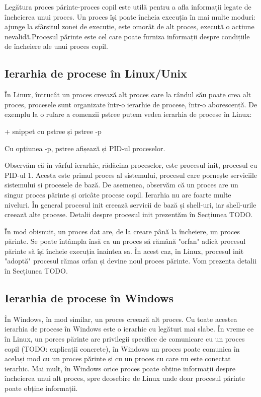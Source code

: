 Legătura proces părinte-proces copil este utilă pentru a afla informații legate
de încheierea unui proces. Un proces își poate încheia execuția în mai multe
moduri: ajunge la sfârșitul zonei de execuție, este omorât de alt proces,
execută o acțiune nevalidă.Procesul părinte este cel care poate furniza
informații despre condițiile de încheiere ale unui proces copil.

\subsection{Ierarhia de procese în Linux/Unix}

În Linux, întrucât un proces creează alt proces care la rândul său poate crea
alt proces, procesele sunt organizate într-o ierarhie de procese, într-o
aborescență. De exemplu la o rulare a comenzii pstree putem vedea ierarhia de
procese în Linux:

+ snippet cu pstree și pstree -p

Cu opțiunea -p, pstree afișează și PID-ul proceselor.

Observăm că în vârful ierarhie, rădăcina proceselor, este procesul init,
procesul cu PID-ul 1. Acesta este primul proces al sistemului, procesul care
pornește serviciile sistemului și procesele de bază. De asemenea, observăm că un
proces are un singur proces părinte și oricâte procese copil. Ierarhia nu are
foarte multe niveluri. În general procesul init creează servicii de bază și
shell-uri, iar shell-urile creează alte procese. Detalii despre procesul init
prezentăm în Secțiunea TODO.

În mod obișnuit, un proces dat are, de la creare până la încheiere, un proces
părinte. Se poate întâmpla însă ca un proces să rămână "orfan" adică procesul
părinte să își încheie execuția înaintea sa. În acest caz, în Linux, procesul
init "adoptă" procesul rămas orfan și devine noul proces părinte. Vom prezenta
detalii în Secțiunea TODO.

\subsection{Ierarhia de procese în Windows}

În Windows, în mod similar, un proces creează alt proces. Cu toate acestea
ierarhia de procese în Windows este o ierarhie cu legături mai slabe. În vreme
ce în Linux, un porces părinte are privilegii specifice de comunicare cu un
proces copil (TODO: explicații concrete), în Windows un proces poate comunica în
același mod cu un proces părinte și cu un proces cu care nu este conectat
ierarhic. Mai mult, în Windows orice proces poate obține informații despre
încheierea unui alt proces, spre deosebire de Linux unde doar procesul părinte
poate obține informații.

